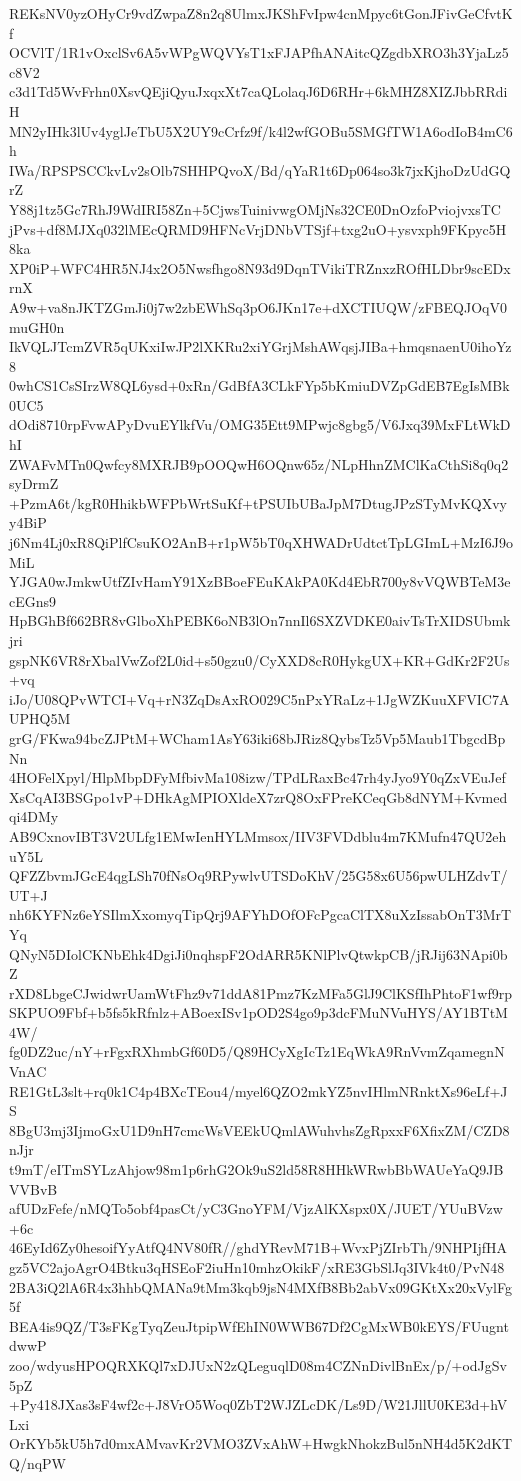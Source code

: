 REKsNV0yzOHyCr9vdZwpaZ8n2q8UlmxJKShFvIpw4cnMpyc6tGonJFivGeCfvtKf
OCVlT/1R1vOxclSv6A5vWPgWQVYsT1xFJAPfhANAitcQZgdbXRO3h3YjaLz5c8V2
c3d1Td5WvFrhn0XsvQEjiQyuJxqxXt7caQLolaqJ6D6RHr+6kMHZ8XIZJbbRRdiH
MN2yIHk3lUv4yglJeTbU5X2UY9cCrfz9f/k4l2wfGOBu5SMGfTW1A6odIoB4mC6h
IWa/RPSPSCCkvLv2sOlb7SHHPQvoX/Bd/qYaR1t6Dp064so3k7jxKjhoDzUdGQrZ
Y88j1tz5Gc7RhJ9WdIRI58Zn+5CjwsTuinivwgOMjNs32CE0DnOzfoPviojvxsTC
jPvs+df8MJXq032lMEcQRMD9HFNcVrjDNbVTSjf+txg2uO+ysvxph9FKpyc5H8ka
XP0iP+WFC4HR5NJ4x2O5Nwsfhgo8N93d9DqnTVikiTRZnxzROfHLDbr9scEDxrnX
A9w+va8nJKTZGmJi0j7w2zbEWhSq3pO6JKn17e+dXCTIUQW/zFBEQJOqV0muGH0n
IkVQLJTcmZVR5qUKxiIwJP2lXKRu2xiYGrjMshAWqsjJIBa+hmqsnaenU0ihoYz8
0whCS1CsSIrzW8QL6ysd+0xRn/GdBfA3CLkFYp5bKmiuDVZpGdEB7EgIsMBk0UC5
dOdi8710rpFvwAPyDvuEYlkfVu/OMG35Ett9MPwjc8gbg5/V6Jxq39MxFLtWkDhI
ZWAFvMTn0Qwfcy8MXRJB9pOOQwH6OQnw65z/NLpHhnZMClKaCthSi8q0q2syDrmZ
+PzmA6t/kgR0HhikbWFPbWrtSuKf+tPSUIbUBaJpM7DtugJPzSTyMvKQXvyy4BiP
j6Nm4Lj0xR8QiPlfCsuKO2AnB+r1pW5bT0qXHWADrUdtctTpLGImL+MzI6J9oMiL
YJGA0wJmkwUtfZIvHamY91XzBBoeFEuKAkPA0Kd4EbR700y8vVQWBTeM3ecEGns9
HpBGhBf662BR8vGlboXhPEBK6oNB3lOn7nnIl6SXZVDKE0aivTsTrXIDSUbmkjri
gspNK6VR8rXbalVwZof2L0id+s50gzu0/CyXXD8cR0HykgUX+KR+GdKr2F2Us+vq
iJo/U08QPvWTCI+Vq+rN3ZqDsAxRO029C5nPxYRaLz+1JgWZKuuXFVIC7AUPHQ5M
grG/FKwa94bcZJPtM+WCham1AsY63iki68bJRiz8QybsTz5Vp5Maub1TbgcdBpNn
4HOFelXpyl/HlpMbpDFyMfbivMa108izw/TPdLRaxBc47rh4yJyo9Y0qZxVEuJef
XsCqAI3BSGpo1vP+DHkAgMPIOXldeX7zrQ8OxFPreKCeqGb8dNYM+Kvmedqi4DMy
AB9CxnovIBT3V2ULfg1EMwIenHYLMmsox/IIV3FVDdblu4m7KMufn47QU2ehuY5L
QFZZbvmJGcE4qgLSh70fNsOq9RPywlvUTSDoKhV/25G58x6U56pwULHZdvT/UT+J
nh6KYFNz6eYSIlmXxomyqTipQrj9AFYhDOfOFcPgcaClTX8uXzIssabOnT3MrTYq
QNyN5DIolCKNbEhk4DgiJi0nqhspF2OdARR5KNlPlvQtwkpCB/jRJij63NApi0bZ
rXD8LbgeCJwidwrUamWtFhz9v71ddA81Pmz7KzMFa5GlJ9ClKSfIhPhtoF1wf9rp
SKPUO9Fbf+b5fs5kRfnlz+ABoexISv1pOD2S4go9p3dcFMuNVuHYS/AY1BTtM4W/
fg0DZ2uc/nY+rFgxRXhmbGf60D5/Q89HCyXgIcTz1EqWkA9RnVvmZqamegnNVnAC
RE1GtL3slt+rq0k1C4p4BXcTEou4/myel6QZO2mkYZ5nvIHlmNRnktXs96eLf+JS
8BgU3mj3IjmoGxU1D9nH7cmcWsVEEkUQmlAWuhvhsZgRpxxF6XfixZM/CZD8nJjr
t9mT/eITmSYLzAhjow98m1p6rhG2Ok9uS2ld58R8HHkWRwbBbWAUeYaQ9JBVVBvB
afUDzFefe/nMQTo5obf4pasCt/yC3GnoYFM/VjzAlKXspx0X/JUET/YUuBVzw+6c
46EyId6Zy0hesoifYyAtfQ4NV80fR//ghdYRevM71B+WvxPjZIrbTh/9NHPIjfHA
gz5VC2ajoAgrO4Btku3qHSEoF2iuHn10mhzOkikF/xRE3GbSlJq3IVk4t0/PvN48
2BA3iQ2lA6R4x3hhbQMANa9tMm3kqb9jsN4MXfB8Bb2abVx09GKtXx20xVylFg5f
BEA4is9QZ/T3sFKgTyqZeuJtpipWfEhIN0WWB67Df2CgMxWB0kEYS/FUugntdwwP
zoo/wdyusHPOQRXKQl7xDJUxN2zQLeguqlD08m4CZNnDivlBnEx/p/+odJgSv5pZ
+Py418JXas3sF4wf2c+J8VrO5Woq0ZbT2WJZLcDK/Ls9D/W21JllU0KE3d+hVLxi
OrKYb5kU5h7d0mxAMvavKr2VMO3ZVxAhW+HwgkNhokzBul5nNH4d5K2dKTQ/nqPW
